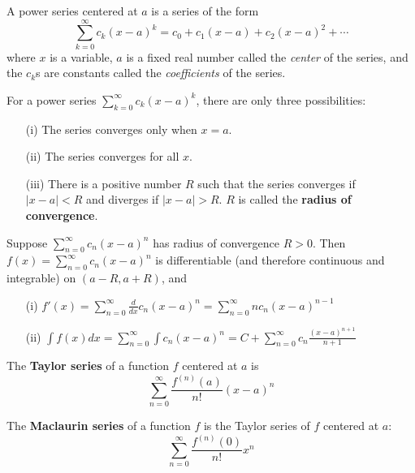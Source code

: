 \begin{definition}
  A power series centered at $a$ is a series of the form
  \[
    \sum_{k = 0}^\infty c_k (x - a)^k = c_0 + c_1(x - a) + c_2(x-a)^2 + \cdots
  \]
  where $x$ is a variable, $a$ is a fixed real number called the \textit{center} of the series, and the $c_k$s are constants called the \textit{coefficients} of the series.
\end{definition}

\begin{theorem}
  For a power series $\sum_{k = 0}^\infty c_k (x - a)^k$, there are only three possibilities:
  \begin{enumerate}
    \item[(i)] The series converges only when $x = a$.
    \item[(ii)] The series converges for all $x$.
    \item[(iii)] There is a positive number $R$ such that the series converges if $|x - a| < R$ and diverges if $|x - a| > R$. $R$ is called the \textbf{radius of convergence}.
  \end{enumerate}
\end{theorem}

\begin{theorem}
  Suppose $\sum_{n = 0}^\infty c_n (x - a)^n$ has radius of convergence $R > 0$. Then $f(x) = \sum_{n = 0}^\infty c_n (x - a)^n$ is differentiable (and therefore continuous and integrable) on $(a - R, a + R)$, and
  \begin{enumerate}
    \item[(i)] $\displaystyle f'(x) = \sum_{n = 0}^\infty \frac{d}{dx} c_n (x - a)^n = \sum_{n = 0}^\infty n c_n (x - a)^{n - 1}$
    \item[(ii)] $\displaystyle \int f(x) dx = \sum_{n = 0}^\infty \int c_n (x - a)^n = C + \sum_{n = 0}^\infty c_n \frac{(x - a)^{n + 1}}{n + 1}$
  \end{enumerate}
\end{theorem}

\begin{definition} The \textbf{Taylor series} of a function $f$ centered at $a$ is
  \[
    \sum_{n = 0}^\infty \frac{f^{(n)}(a)}{n!} (x - a)^n
  \]
\end{definition}

\begin{definition} The \textbf{Maclaurin series} of a function $f$ is the Taylor series of $f$ centered at $a$:
  \[
    \sum_{n = 0}^\infty \frac{f^{(n)}(0)}{n!} x^n
  \]
\end{definition}

